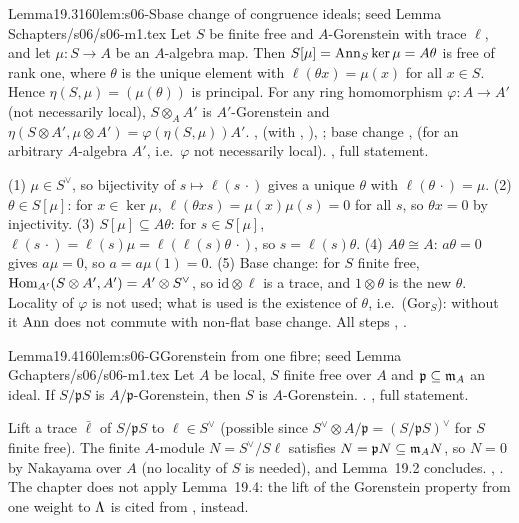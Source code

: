 \begin{quoted}{Lemma}{19.3}{160}{lem:s06-S}{base change of congruence ideals; seed Lemma S}{chapters/s06/s06-m1.tex}\label{rpt:lem:s06-S}
Let $S$ be finite free and $A$-Gorenstein with trace $\ell$, and let $\mu:S\to A$ be an $A$-algebra map. Then
$S[\mu]=\operatorname{Ann}_S\ker\mu=A\theta$ is free of rank one, where $\theta$ is the unique element with $\ell(\theta x)=\mu(x)$ for all $x\in S$.
Hence $\eta(S,\mu)=(\mu(\theta))$ is principal. For any ring homomorphism $\varphi:A\to A'$ (not necessarily local), $S\otimes_AA'$ is $A'$-Gorenstein and
$\eta(S\otimes A',\mu\otimes A')=\varphi(\eta(S,\mu))A'$. \stproved{} ,
 (with , ), ;
base change , 
(for an arbitrary $A$-algebra $A'$, i.e.\ $\varphi$ not necessarily local). \stformalized{}, full statement.
\end{quoted}
\begin{outline}
(1) $\mu\in S^\vee$, so bijectivity of $s\mapsto\ell(s\,\cdot)$ gives a unique $\theta$ with $\ell(\theta\,\cdot)=\mu$.
(2) $\theta\in S[\mu]$: for $x\in\ker\mu$, $\ell(\theta xs)=\mu(x)\mu(s)=0$ for all $s$, so $\theta x=0$ by injectivity.
(3) $S[\mu]\subseteq A\theta$: for $s\in S[\mu]$, $\ell(s\,\cdot)=\ell(s)\mu=\ell(\ell(s)\theta\,\cdot)$, so $s=\ell(s)\theta$.
(4) $A\theta\cong A$: $a\theta=0$ gives $a\mu=0$, so $a=a\mu(1)=0$.
(5) Base change: for $S$ finite free, $\operatorname{Hom}_{A'}(S\otimes A',A')=A'\otimes S^\vee$, so $\mathrm{id}\otimes\ell$ is a trace, and $1\otimes\theta$ is
the new $\theta$. Locality of $\varphi$ is not used; what is used is the existence of $\theta$, i.e.\ (Gor$_S$): without it $\operatorname{Ann}$ does not
commute with non-flat base change. All steps \stproved, \stformal.
\end{outline}

\begin{quoted}{Lemma}{19.4}{160}{lem:s06-G}{Gorenstein from one fibre; seed Lemma G}{chapters/s06/s06-m1.tex}\label{rpt:lem:s06-G}
Let $A$ be local, $S$ finite free over $A$ and $\mathfrak p\subseteq\mathfrak{m}_A$ an ideal. If $S/\mathfrak pS$ is $A/\mathfrak p$-Gorenstein, then
$S$ is $A$-Gorenstein. \stproved{} . \stformalized{}, full statement.
\end{quoted}
\begin{outline}
Lift a trace $\bar\ell$ of $S/\mathfrak pS$ to $\ell\in S^\vee$ (possible since $S^\vee\otimes A/\mathfrak p=(S/\mathfrak pS)^\vee$ for $S$ finite free).
The finite $A$-module $N=S^\vee/S\ell$ satisfies $N=\mathfrak pN\subseteq\mathfrak{m}_AN$, so $N=0$ by Nakayama over $A$ (no locality of $S$ is needed), and
Lemma~19.2 concludes. \stproved, \stformal. The chapter does not apply Lemma~19.4: the lift of the Gorenstein property from one weight to
$\Lambda$ is cited from \cite{Hs}, \cite{MW86} instead.
\end{outline}

